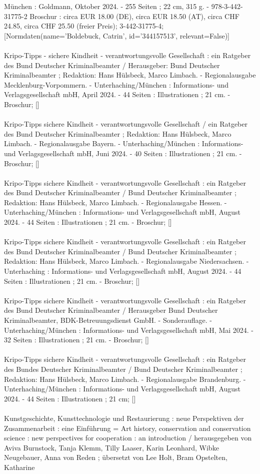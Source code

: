 \documentclass{article}
\begin{document}
\begin{multicols}{3}
München : Goldmann, Oktober 2024. - 255 Seiten ; 22 cm, 315 g. - 978-3-442-31775-2 Broschur : circa EUR 18.00 (DE), circa EUR 18.50 (AT), circa CHF 24.85, circa CHF 25.50 (freier Preis); 3-442-31775-4; [Normdaten(name='Boldebuck, Catrin', id='344157513', relevant=False)]\\\\Kripo-Tipps - sichere Kindheit - verantwortungsvolle Gesellschaft : ein Ratgeber des Bund Deutscher Kriminalbeamter / Herausgeber: Bund Deutscher Kriminalbeamter ; Redaktion: Hans Hülsbeck, Marco Limbach. - Regionalausgabe Mecklenburg-Vorpommern. - Unterhaching/München : Informations- und Verlagsgesellschaft mbH, April 2024. - 44 Seiten : Illustrationen ; 21 cm. - Broschur; []\\\\Kripo-Tipps sichere Kindheit - verantwortungsvolle Gesellschaft / ein Ratgeber des Bund Deutscher Kriminalbeamter ; Redaktion: Hans Hülsbeck, Marco Limbach. - Regionalausgabe Bayern. - Unterhaching/München : Informations- und Verlagsgesellschaft mbH, Juni 2024. - 40 Seiten : Illustrationen ; 21 cm. - Broschur; []\\\\Kripo-Tipps sichere Kindheit - verantwortungsvolle Gesellschaft : ein Ratgeber des Bund Deutscher Kriminalbeamter / Bund Deutscher Kriminalbeamter ; Redaktion: Hans Hülsbeck, Marco Limbach. - Regionalausgabe Hessen. - Unterhaching/München : Informations- und Verlagsgesellschaft mbH, August 2024. - 44 Seiten : Illustrationen ; 21 cm. - Broschur; []\\\\Kripo-Tipps sichere Kindheit - verantwortungsvolle Gesellschaft : ein Ratgeber des Bund Deutscher Kriminalbeamter / Bund Deutscher Kriminalbeamter ; Redaktion: Hans Hülsbeck, Marco Limbach. - Regionalausgabe Niedersachsen. - Unterhaching : Informations- und Verlagsgesellschaft mbH, August 2024. - 44 Seiten : Illustrationen ; 21 cm. - Broschur; []\\\\Kripo-Tipps sichere Kindheit - verantwortungsvolle Gesellschaft : ein Ratgeber des Bund Deutscher Kriminalbeamter / Herausgeber Bund Deutscher Kriminalbeamter, BDK-Betreuungsdienst GmbH. - Sonderauflage. - Unterhaching/München : Informations- und Verlagsgesellschaft mbH, Mai 2024. - 32 Seiten : Illustrationen ; 21 cm. - Broschur; []\\\\Kripo-Tipps sichere Kindheit - verantwortungsvolle Gesellschaft : ein Ratgeber des Bundes Deutscher Kriminalbeamter / Bund Deutscher Kriminalbeamter ; Redaktion: Hans Hülsbeck, Marco Limbach. - Regionalausgabe Brandenburg. - Unterhaching/München : Informations- und Verlagsgesellschaft mbH, August 2024. - 44 Seiten : Illustrationen ; 21 cm; []\\\\Kunstgeschichte, Kunsttechnologie und Restaurierung : neue Perspektiven der Zusammenarbeit : eine Einführung = Art history, conservation and conservation science : new perspectives for cooperation : an introduction / herausgegeben von Aviva Burnstock, Tanja Klemm, Tilly Laaser, Karin Leonhard, Wibke Neugebauer, Anna von Reden ; übersetzt von Lee Holt, Bram Opstelten, Katharine 
\end{multicols}
\end{document}
